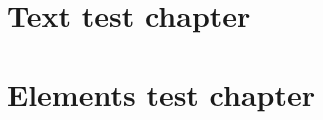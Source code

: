 \documentclass[paper=a4, fontsize=12pt]{report}
\begin{document}
	\begin{titlepage}
		\printTitlePage		
	\end{titlepage}
	

	\chapter{Text test chapter}\label{sec:first}
	

	
	\chapter{Elements test chapter}\label{sec:second}
	
	

	
	
\end{document}
